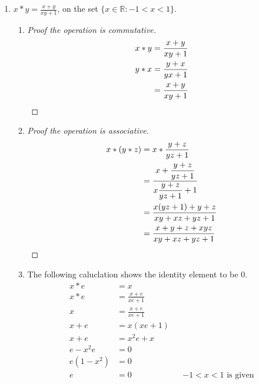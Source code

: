 \documentclass[twoside]{amsart}
\newcommand{\Reals}{\mathbb{R}{}}
\begin{document}
\begin{enumerate}[A.]
\begin{enumerate}[1.]
\begin{enumerate}
	    \item The following calculation shows the inverse of $x$ is 
	    $\displaystyle \frac{-x}{1+x}$.
	    \begin{align*}
	       x * x' & = 0            \\
	       x * x' & = x + x' + xx' \\
		    0 & = x + x' + xx' \\
		    0 & = x + x'(1 + x) \\
		   -x & = x'(1+x) \\
	       x'(1+x)& = -x \\
		   x' & = \frac{-x}{1+x} && \text{$x\ne-1$ given}
	    \end{align*}

	 \end{enumerate}

	 \item $x * y = \displaystyle \frac{x + y}{xy + 1}$, on the set
	 $\{x \in \Reals : -1 < x < 1\}$.
	 \begin{enumerate}
	    \item
	    \begin{proof}[Proof the operation is commutative]
	       \begin{align*}
		  x * y & = \frac{x+y}{xy + 1} \\
		  y * x & = \frac{y+x}{yx + 1} \\
			& = \frac{x+y}{xy + 1} \qedhere
	       \end{align*}
	    \end{proof}

	    \item
	    \begin{proof}[Proof the operation is associative]
	       \begin{align*}
		  x * (y * z) & = x * \frac{y + z}{yz + 1} \\
			      & = \frac{x + \displaystyle \frac{y + z}{yz + 1}}
				  {x\displaystyle \frac{y + z}{yz + 1} + 1} \\
			      & = \frac{x(yz+1)+y+z}{xy+xz+yz+1} \\
			      & = \frac{x + y + z + xyz}{xy + xz + yz + 1}
				  \qedhere
	       \end{align*}
	    \end{proof}

	    \item The following caluclation shows the identity element to be 0.
	    \begin{align*}
	       x * e & = x \\
	       x * e & = \frac{x + e}{xe + 1} \\
		   x & = \frac{x + e}{xe + 1} \\
	       x + e & = x(xe + 1) \\
	       x + e & = x^2e + x \\
	       e - x^2e & = 0  \\
	       e(1-x^2) & = 0    \\
		   e & = 0  && \text{$-1 < x < 1$ is given}
	    \end{align*}


\end{enumerate}
\end{enumerate}
\end{enumerate}
\end{document}
